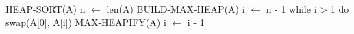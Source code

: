 \begin{pseudocode}[caption={Algoritmo de ordenação utilizando uma \textit{Heap}}, label={heapSortP}]
HEAP-SORT(A)
n $\gets$ len(A)
BUILD-MAX-HEAP(A)
i $\gets$ n - 1
while i > 1 do
    swap(A[0], A[i])
    MAX-HEAPIFY(A)
    i $\gets$ i - 1
\end{pseudocode}